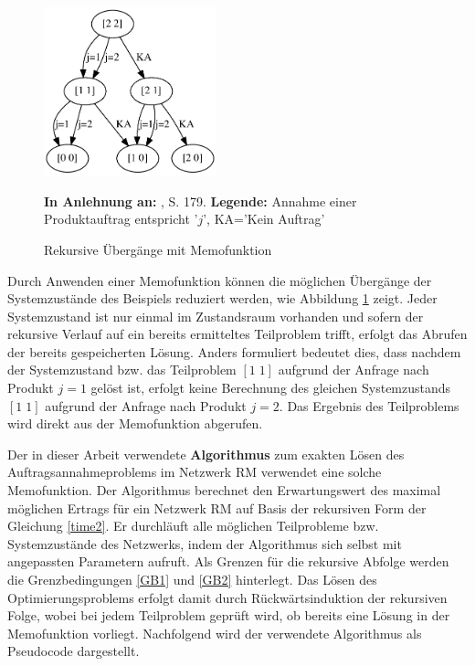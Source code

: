 \begin{figure}[h!]
  \begin{center}
    \includegraphics[width=50mm]{Bilder/Einfach2.pdf}
    \caption{Rekursive Übergänge mit Memofunktion}  \label{Einfach2}
        {\footnotesize \textbf{In Anlehnung an:} \cite{hetland2010python}, S. 179.} 
    {\footnotesize \textbf{Legende:} Annahme einer Produktauftrag entspricht '$j$', KA='Kein Auftrag'} 
  \end{center}
\end{figure}

Durch Anwenden einer Memofunktion können die möglichen Übergänge der Systemzustände des Beispiels reduziert werden, wie Abbildung \ref{Einfach2} zeigt. Jeder Systemzustand ist nur einmal im Zustandsraum vorhanden und sofern der rekursive Verlauf auf ein bereits ermitteltes Teilproblem trifft, erfolgt das Abrufen der bereits gespeicherten Lösung. Anders formuliert bedeutet dies, dass nachdem der Systemzustand bzw. das Teilproblem $[1\; 1]$ aufgrund der Anfrage nach Produkt $j=1$ gelöst ist, erfolgt keine Berechnung des gleichen Systemzustands $[1\; 1]$ aufgrund der Anfrage nach Produkt $j=2$. Das Ergebnis des Teilproblems wird direkt aus der Memofunktion abgerufen.

Der in dieser Arbeit verwendete \textbf{Algorithmus} zum exakten Lösen des Auftragsannahmeproblems im Netzwerk RM verwendet eine solche Memofunktion. Der Algorithmus berechnet den Erwartungswert des maximal möglichen Ertrags für ein Netzwerk RM auf Basis der rekursiven Form der Gleichung \eqref{time2}. Er durchläuft alle möglichen Teilprobleme bzw. Systemzustände des Netzwerks, indem der Algorithmus sich selbst mit angepassten Parametern aufruft. Als Grenzen für die rekursive Abfolge werden die Grenzbedingungen \eqref{GB1} und \eqref{GB2} hinterlegt. Das Lösen des Optimierungsproblems erfolgt damit durch Rückwärtsinduktion der rekursiven Folge, wobei bei jedem Teilproblem geprüft wird, ob bereits eine Lösung in der Memofunktion vorliegt. Nachfolgend wird der verwendete Algorithmus als Pseudocode dargestellt.


